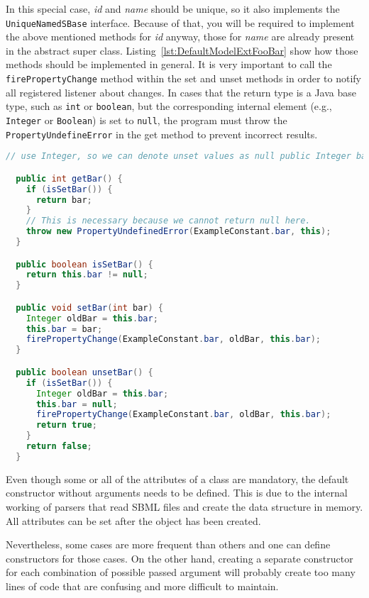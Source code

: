 In this special case, \emph{id} and \emph{name} should be unique, so it also
implements the \texttt{UniqueNamedSBase} interface.
Because of that, you will be required to implement the above mentioned methods
for \emph{id} anyway, those for \emph{name} are already present in the abstract super class.
Listing~\ref{lst:DefaultModelExtFooBar} show how those methods should be
implemented in general. It is very important to call the
\texttt{firePropertyChange} method within the set and unset
methods in order to notify all registered listener about changes. In cases that
the return type is a Java base type, such as \texttt{int} or \texttt{boolean},
but the corresponding internal element (e.g., \texttt{Integer} or
\texttt{Boolean}) is set to \texttt{null}, the program must throw the
\texttt{PropertyUndefineError} in the get method to prevent incorrect results.

\begin{lstlisting}[language=Java,caption={Five necessary methods that should be
created for each \texttt{Foo} class attribute in detail},
label={lst:DefaultModelExtFooBar}]
  // use Integer, so we can denote unset values as null public Integer bar;

  public int getBar() {
    if (isSetBar()) {
      return bar;
    }
    // This is necessary because we cannot return null here.
    throw new PropertyUndefinedError(ExampleConstant.bar, this);
  }

  public boolean isSetBar() {
    return this.bar != null;
  }

  public void setBar(int bar) {
    Integer oldBar = this.bar;
    this.bar = bar;
    firePropertyChange(ExampleConstant.bar, oldBar, this.bar);
  }

  public boolean unsetBar() {
    if (isSetBar()) {
      Integer oldBar = this.bar;
      this.bar = null;
      firePropertyChange(ExampleConstant.bar, oldBar, this.bar);
      return true;
    }
    return false;
  }
\end{lstlisting}

Even though some or all of the attributes of a class are mandatory, the default constructor without arguments needs to be defined.
This is due to the internal working of parsers that read SBML files and create the data structure in memory.
All attributes can be set after the object has been created.

Nevertheless, some cases are more frequent than others and one can define constructors for those cases.
On the other hand, creating a separate constructor for each combination of possible passed argument will probably create too many lines of code
that are confusing and more difficult to maintain.

